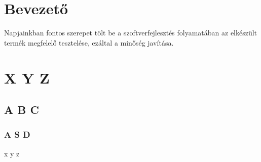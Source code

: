 \documentclass[a4paper, 12pt]{msc-style}
\begin{document}

\cleardoublepage
\tableofcontents
\thispagestyle{empty}
\cleardoublepage

\chapter{Bevezető}
Napjainkban fontos szerepet tölt be a szoftverfejlesztés folyamatában az elkészült
termék megfelelő tesztelése, ezáltal a minőség javítása.

\chapter{X Y Z}

\section{A B C}

\subsection{A S D}

x y z

%  
%  

\end{document}
